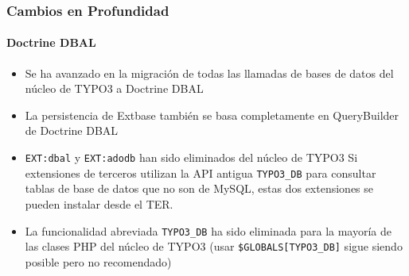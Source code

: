 
\begin{frame}[fragile]
	\frametitle{Cambios en Profundidad}
	\framesubtitle{Doctrine DBAL}

	\begin{itemize}
		\item Se ha avanzado en la migración de todas las llamadas de bases de datos del núcleo de TYPO3 a Doctrine DBAL
		\item La persistencia de Extbase también se basa completamente en QueryBuilder de Doctrine DBAL
		\item \texttt{EXT:dbal} y \texttt{EXT:adodb} han sido eliminados del núcleo de TYPO3\newline
			\smaller
				Si extensiones de terceros utilizan la API antigua \texttt{TYPO3\_DB} para consultar tablas de base de datos que no son de MySQL, estas dos extensiones se pueden instalar desde el TER.
			\normalsize

		\item La funcionalidad abreviada \texttt{TYPO3\_DB} ha sido eliminada para la mayoría de las clases PHP del núcleo de TYPO3\newline
			\smaller
				(usar \texttt{\$GLOBALS[TYPO3\_DB]} sigue siendo posible pero no recomendado)
			\normalsize

	\end{itemize}

\end{frame}


